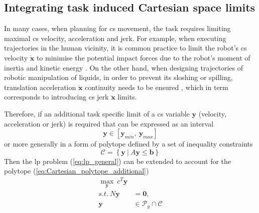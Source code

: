 \subsection{Integrating task induced Cartesian space limits}

In many cases, when planning for \gls{cs} movement, the task requires limiting maximal \gls{cs} velocity, acceleration and jerk. For example, when executing trajectories in the human vicinity, it is common practice to limit the robot's \gls{cs} velocity $\dot{\bm{x}}$ to minimise the potential impact forces due to the robot's moment of inertia \cite{smu} and kinetic energy \cite{joseph2020}.
On the other hand, when designing trajectories of robotic manipulation of liquids, in order to prevent its sloshing or spilling, translation acceleration $\ddot{\bm{x}}$ continuity needs to be ensured \cite{moriello2018}, which in term corresponds to introducing \gls{cs} jerk $\dddot{\bm{x}}$ limits.

Therefore, if an additional task specific limit of a \gls{cs} variable $\bm{y}$ (velocity, acceleration or jerk) is required that can be expressed as an interval
\begin{equation}
\bm{y}\in  [\bm{y}_{min},~\bm{y}_{max}]\label{eq:limits_cs_additional}
\end{equation}
or more generally in a form of polytope defined by a set of inequality constraints
\begin{equation}
\mathcal{C} = \left\{ \bm{y} ~|~ A \bm{y} \leq \bm{b} \right\}
\label{eq:Cartesian_polytope_additional}
\end{equation}
Then the \gls{lp} problem (\ref{eq:lp_general}) can be extended to account for the polytope (\ref{eq:Cartesian_polytope_additional})
\begin{equation}
\begin{split}
    \max_{\bm{y}} ~c^T \bm{y}& \\
    s.t. ~ N\bm{y} &= \bm{0}, \\
    \bm{y}&\in \mathcal{P}_y \cap \mathcal{C}
\end{split}\label{eq:lp_general_additional}
\end{equation}


